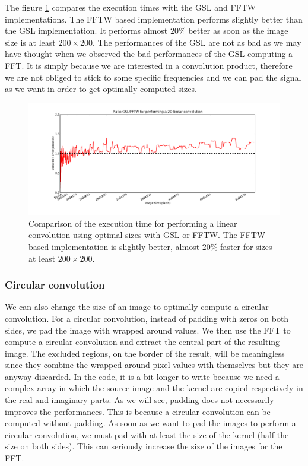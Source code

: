 \documentclass[a4paper,10pt,twoside]{article}
\begin{document}
The figure \ref{fig:benchmark_linear_convolution_compare.pdf} compares the execution times with the GSL and FFTW implementations. The FFTW based implementation performs slightly better than the GSL implementation. It performs almost $20\%$ better as soon as the image size is at least $200 \times 200$. The performances of the GSL are not as bad as we may have thought when we observed the bad performances of the GSL computing a FFT. It is simply because we are interested in a convolution product, therefore we are not obliged to stick to some specific frequencies and we can pad the signal as we want in order to get optimally computed sizes.

\begin{figure}[htbp]
\center \includegraphics[width=0.85\linewidth]{Images/benchmark_linear_convolution_compare.pdf}
\caption{\label{fig:benchmark_linear_convolution_compare.pdf}Comparison of the execution time for performing a linear convolution using optimal sizes with GSL or FFTW. The FFTW based implementation is slightly better, almost $20\%$ faster for sizes at least $200\times 200$.}
\end{figure}


\subsubsection{Circular convolution}

We can also change the size of an image to optimally compute a circular convolution. For a circular convolution, instead of padding with zeros on both sides, we pad the image with wrapped around values. We then use the FFT to compute a circular convolution and extract the central part of the resulting image. The excluded regions, on the border of the result, will be meaningless since they combine the wrapped around pixel values with themselves but they are anyway discarded. In the code, it is a bit longer to write because we need a complex array in which the source image and the kernel are copied respectively in the real and imaginary parts. As we will see, padding does not necessarily improves the performances. This is because a circular convolution can be computed without padding. As soon as we want to pad the images to perform a circular convolution, we must pad with at least the size of the kernel (half the size on both sides). This can seriously increase the size of the images for the FFT.\\
\end{document}
